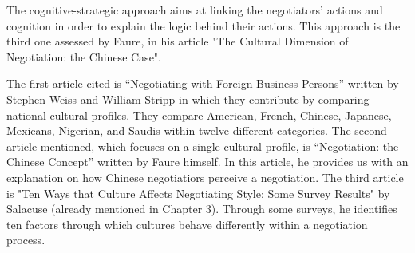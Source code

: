 \documentclass[../main.tex]{subfiles}
\begin{document}
The cognitive-strategic approach aims at linking the negotiators' actions and cognition in order to explain the logic behind their actions. This approach is the third one assessed by Faure, in his article "The Cultural Dimension of Negotiation: the Chinese Case".

The first article cited is “Negotiating with Foreign Business Persons” written by Stephen Weiss and William Stripp in which they contribute by comparing national cultural profiles. They compare American, French, Chinese, Japanese, Mexicans, Nigerian, and Saudis within twelve different categories.
The second article mentioned, which focuses on a single cultural profile, is “Negotiation: the Chinese Concept” written by Faure himself. In this article, he provides us with an explanation on how Chinese negotiatiors perceive a negotiation.
The third article is "Ten Ways that Culture Affects Negotiating Style: Some Survey Results" by Salacuse (already mentioned in Chapter 3). Through some surveys, he identifies ten factors through which cultures behave differently within a negotiation process. \\
\end{document}
